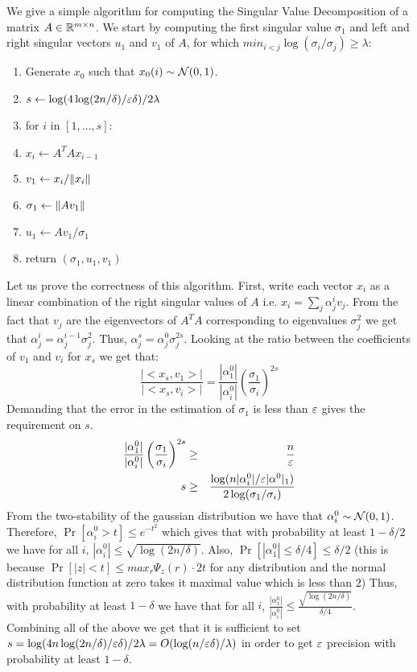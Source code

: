 \documentclass{article}
\begin{document}


We give a simple algorithm for computing the Singular Value Decomposition of a matrix $A \in {\mathbb{R}}^{m \times n}$.
We start by computing the first singular value $\sigma_1$ and left and right singular vectors $u_1$ and $v_1$ of $A$,
for which $min_{i<j}\log(\sigma_i/\sigma_j) \ge \lambda$:
\begin{enumerate}
\item Generate $x_0$ such that $x_0(i) \sim {\mathcal{N}}(0,1)$.
\item $s \leftarrow  \log(4\log(2n/\delta)/\varepsilon\delta)/2\lambda$ 
\item for $i$ in $[1,\ldots,s]$:
\item \tab $x_i \leftarrow A^{T}Ax_{i-1}$
\item $v_1 \leftarrow x_i/\| x_i \|$  
\item $\sigma_1 \leftarrow \| Av_1 \|$
\item $u_1 \leftarrow Av_1/\sigma_1$ 
\item return $(\sigma_1,u_1,v_1)$ 
\end{enumerate}
Let us prove the correctness of this algorithm.
First, write each vector $x_i$ as a linear combination of the right singular values of $A$ i.e. $x_i = \sum_{j} \alpha^{i}_{j}v_j$. 
From the fact that $v_j$ are the eigenvectors of $A^{T}A$ corresponding to eigenvalues $\sigma^{2}_j$ 
we get that $\alpha^{i}_{j}= \alpha^{i-1}_{j}\sigma^{2}_{j}$.
Thus, $\alpha^{s}_{j} = \alpha^{0}_{j}\sigma^{2s}_{j}$. Looking at the ratio between the coefficients of $v_1$ and $v_i$ for $x_s$
we get that:
 \[
 \frac{|<x_s,v_1>|}{|<x_s,v_i>|} = \frac{|\alpha^{0}_{1}|}{|\alpha^{0}_{i}|}\left(\frac{\sigma_1}{\sigma_i}\right)^{2s}
\]
Demanding that the error in the estimation of $\sigma_1$ is less than $\varepsilon$ gives the requirement on $s$.
\begin{eqnarray}
\frac{|\alpha^{0}_{1}|}{|\alpha^{0}_{i}|}\left(\frac{\sigma_1}{\sigma_i}\right)^{2s} &\ge& \frac{n}{\varepsilon}\\
s &\ge& \frac{\log(n|\alpha^{0}_i|/\varepsilon|\alpha^{0}|_1)}{2\log(\sigma_1/\sigma_i)}
\end{eqnarray}
From the two-stability of the gaussian distribution we have that $\alpha^{0}_i \sim {\mathcal{N}}(0,1)$. 
Therefore, $\Pr[\alpha^{0}_i > t] \le e^{-t^2}$ which gives that with probability at least $1-\delta/2$ we have for
all $i$, $|\alpha^{0}_i | \le \sqrt{\log(2n/\delta)}$. Also, $\Pr[|\alpha^{0}_1 | \le \delta/4 ] \le \delta/2$ (this is because 
$\Pr[|z| < t] \le max_{r}\Psi_{z}(r)\cdot2t$ for any distribution and the normal distribution function at zero takes it maximal value which is less than $2$) 
Thus, with probability at least $1-\delta$ we have that for all $i$, $\frac{|\alpha^{0}_{1}|}{|\alpha^{0}_{i}|} \le \frac{\sqrt{\log(2n/\delta)}}{\delta/4}$.
Combining all of the above we get that it is sufficient to set $s = \log(4n\log(2n/\delta)/\varepsilon\delta)/2\lambda = O(\log(n/\varepsilon\delta)/\lambda)$
in order to get $\varepsilon$ precision with probability at least $1-\delta$.
\end{document}
